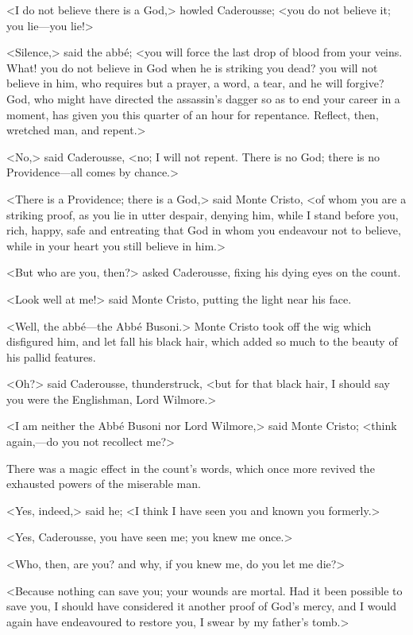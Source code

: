  <I do not believe there is a God,> howled Caderousse; <you do not believe it; you lie—you lie!> 

 <Silence,> said the abbé; <you will force the last drop of blood from your veins. What! you do not believe in God when he is striking you dead? you will not believe in him, who requires but a prayer, a word, a tear, and he will forgive? God, who might have directed the assassin's dagger so as to end your career in a moment, has given you this quarter of an hour for repentance. Reflect, then, wretched man, and repent.> 

 <No,> said Caderousse, <no; I will not repent. There is no God; there is no Providence—all comes by chance.> 

 <There is a Providence; there is a God,> said Monte Cristo, <of whom you are a striking proof, as you lie in utter despair, denying him, while I stand before you, rich, happy, safe and entreating that God in whom you endeavour not to believe, while in your heart you still believe in him.> 

 <But who are you, then?> asked Caderousse, fixing his dying eyes on the count. 

 <Look well at me!> said Monte Cristo, putting the light near his face. 

 <Well, the abbé—the Abbé Busoni.> Monte Cristo took off the wig which disfigured him, and let fall his black hair, which added so much to the beauty of his pallid features. 

 <Oh?> said Caderousse, thunderstruck, <but for that black hair, I should say you were the Englishman, Lord Wilmore.> 

 <I am neither the Abbé Busoni nor Lord Wilmore,> said Monte Cristo; <think again,—do you not recollect me?> 

 There was a magic effect in the count's words, which once more revived the exhausted powers of the miserable man. 

 <Yes, indeed,> said he; <I think I have seen you and known you formerly.> 

 <Yes, Caderousse, you have seen me; you knew me once.> 

 <Who, then, are you? and why, if you knew me, do you let me die?> 

 <Because nothing can save you; your wounds are mortal. Had it been possible to save you, I should have considered it another proof of God's mercy, and I would again have endeavoured to restore you, I swear by my father's tomb.> 

